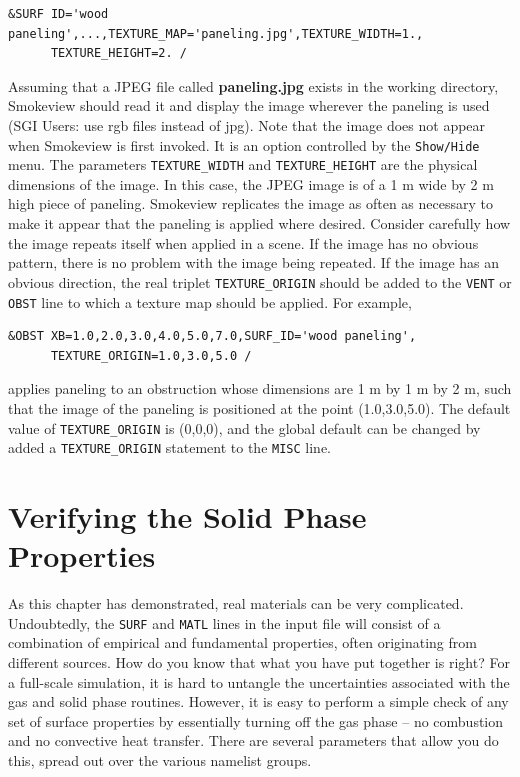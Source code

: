\documentclass[11pt]{book}
\newcommand{\ct}{\tt\small}
\begin{document}
\footnotesize
\begin{verbatim}
&SURF ID='wood paneling',...,TEXTURE_MAP='paneling.jpg',TEXTURE_WIDTH=1.,
      TEXTURE_HEIGHT=2. /
\end{verbatim}
\normalsize
Assuming that a JPEG file called {\bf paneling.jpg} exists in the
working directory, Smokeview should read it and display the image
wherever the paneling is used (SGI Users: use rgb files instead of jpg).
Note that the image does not appear when Smokeview is first invoked. It is an option controlled by
the {\ct Show/Hide} menu. The parameters {\ct TEXTURE\_WIDTH}
and {\ct TEXTURE\_HEIGHT} are the physical dimensions of the image.
  In this case,
the JPEG image is of a 1 m wide by 2 m high piece of
paneling. Smokeview replicates the image as often as necessary to
make it appear that the paneling is applied where desired.
Consider carefully how the image repeats itself when
applied in a scene. If the image has no obvious pattern, there is no
problem with the image being repeated. If the image has an obvious
direction, the real triplet {\ct TEXTURE\_ORIGIN} should be added to
the {\ct VENT} or {\ct OBST} line to which a texture map
should be applied. For example,

\footnotesize
\begin{verbatim}
&OBST XB=1.0,2.0,3.0,4.0,5.0,7.0,SURF_ID='wood paneling',
      TEXTURE_ORIGIN=1.0,3.0,5.0 /
\end{verbatim}
\normalsize
applies paneling to an obstruction whose dimensions are 1 m by
1 m by 2 m, such that the image of the paneling is positioned
at the point (1.0,3.0,5.0). The default value of {\ct TEXTURE\_ORIGIN}
is (0,0,0), and the global default can be changed by added a
{\ct TEXTURE\_ORIGIN} statement to the {\ct MISC} line.




\clearpage

\section{Verifying the Solid Phase Properties}
\label{solid_phase_verification}

As this chapter has demonstrated, real materials can be very complicated. Undoubtedly, the {\ct SURF} and {\ct MATL} lines in the
input file will consist of a combination of empirical and fundamental properties, often originating from different sources. How do you know
that what you have put together is right? For a full-scale simulation, it is hard to untangle the uncertainties associated with the gas and solid
phase routines. However, it is easy to perform a simple check of any set of surface properties by essentially turning off the gas phase -- no combustion and
no convective heat transfer. There are several parameters that allow you do this, spread out over the various namelist groups.
\end{document}
